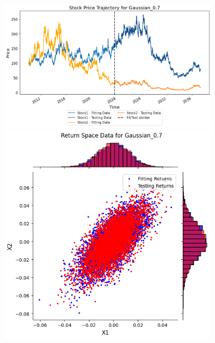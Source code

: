 \begin{figure}
\begin{minipage}{0.9\textwidth}
\begin{minipage}{0.34\textwidth}
        \end{minipage}
    \end{minipage}
    \hfill
    \begin{minipage}{0.9\textwidth}
        \centering
        \begin{minipage}{0.54\textwidth}
            \centering
            \includegraphics[width=\textwidth]{4Method/pictures/PricePort2.png}
        \end{minipage}
        \hfill
        \begin{minipage}{0.34\textwidth}
            \centering
            \includegraphics[width=\textwidth]{4Method/pictures/ReturnPort2.png}

\end{minipage}
\end{minipage}
\end{figure}

